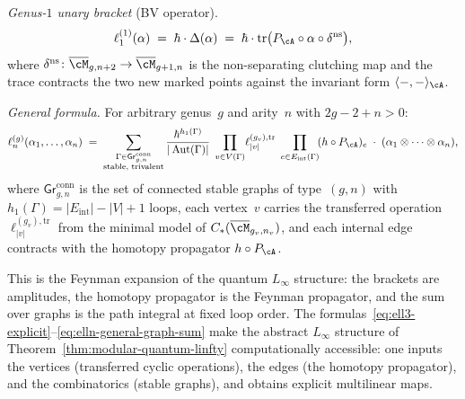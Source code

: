 \begin{construction}
\emph{Genus-$1$ unary bracket} \textup{(}BV operator\textup{)}.
\begin{equation}
\label{eq:ell1-genus1}
\ell_1^{(1)}(\alpha)
\;=\;
\hbar \cdot \Delta(\alpha)
\;=\;
\hbar \cdot \operatorname{tr}\bigl(
P_{\cA} \circ \alpha \circ \delta^{\mathrm{ns}}
\bigr),
\end{equation}
where $\delta^{\mathrm{ns}}\colon
\overline{\cM}_{g,n+2} \to \overline{\cM}_{g+1,n}$ is the
non-separating clutching map and the trace contracts the two
new marked points against the invariant form
$\langle -,- \rangle_{\cA}$.

\emph{General formula.}
For arbitrary genus~$g$ and arity~$n$ with $2g-2+n > 0$:
\begin{equation}
\label{eq:elln-general-graph-sum}
\ell_n^{(g)}(\alpha_1,\ldots,\alpha_n)
\;=\;
\sum_{\substack{
\Gamma \in \mathsf{Gr}^{\mathrm{conn}}_{g,n} \\
\text{stable, trivalent}}}
\frac{\hbar^{h_1(\Gamma)}}{|\operatorname{Aut}(\Gamma)|}
\;\prod_{v \in V(\Gamma)}\!
\ell_{|v|}^{(g_v),\mathrm{tr}}
\;\prod_{e \in E_{\mathrm{int}}(\Gamma)}\!
(h \circ P_{\cA})_e
\;\cdot\;
(\alpha_1 \otimes \cdots \otimes \alpha_n),
\end{equation}
where $\mathsf{Gr}^{\mathrm{conn}}_{g,n}$ is the set of connected
stable graphs of type~$(g,n)$ with
$h_1(\Gamma) = |E_{\mathrm{int}}| - |V| + 1$ loops, each vertex~$v$
carries the transferred operation
$\ell_{|v|}^{(g_v),\mathrm{tr}}$ from the minimal model of
$C_*(\overline{\cM}_{g_v,n_v})$, and each internal edge
contracts with the homotopy propagator $h \circ P_{\cA}$.

This is the Feynman expansion of the quantum $L_\infty$ structure:
the brackets are amplitudes, the homotopy propagator is the Feynman
propagator, and the sum over graphs is the path integral at fixed
loop order.
The formulas~\eqref{eq:ell3-explicit}--\eqref{eq:elln-general-graph-sum}
make the abstract $L_\infty$ structure of
Theorem~\textup{\ref{thm:modular-quantum-linfty}}
computationally accessible: one inputs the vertices (transferred
cyclic operations), the edges (the homotopy propagator), and the
combinatorics (stable graphs), and obtains explicit multilinear
maps.


\end{construction}
